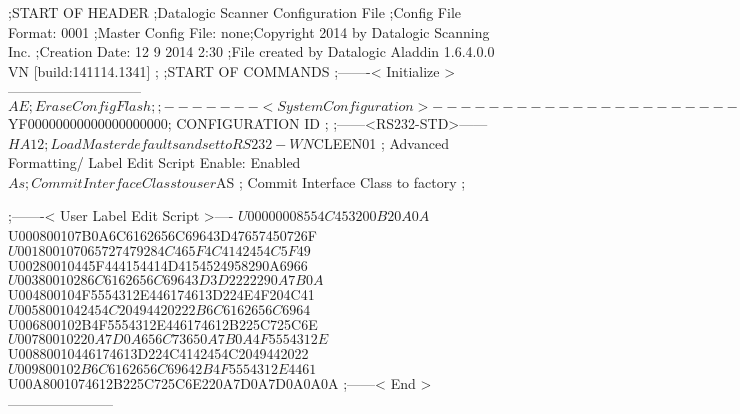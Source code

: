 ;START OF HEADER
;Datalogic Scanner Configuration File
;Config File Format: 0001
;Master Config File: none;Copyright 2014 by Datalogic Scanning Inc.
;Creation Date: 12 9 2014 2:30
;File created by Datalogic Aladdin 1.6.4.0.0 VN [build:141114.1341]
;
;START OF COMMANDS
;-------< Initialize >-----------------------------
$AE                 ; Erase Config Flash
;
;-------< System Configuration >-------------------------------
$YF00000000000000000000; CONFIGURATION ID
;
;------<RS232-STD>------
$HA12               ; Load Master defaults and set to RS232-WN
$CLEEN01            ; Advanced Formatting/ Label Edit Script Enable: Enabled
$As                 ; Commit Interface Class to user
$AS                 ; Commit Interface Class to factory
;

;-------< User Label Edit Script >----
$U00000008554C453200B20A0A
$U000800107B0A6C6162656C69643D47657450726F
$U001800107065727479284C465F4C4142454C5F49
$U00280010445F444154414D4154524958290A6966
$U00380010286C6162656C69643D3D2222290A7B0A
$U004800104F5554312E446174613D224E4F204C41
$U0058001042454C20494420222B6C6162656C6964
$U006800102B4F5554312E446174612B225C725C6E
$U00780010220A7D0A656C73650A7B0A4F5554312E
$U00880010446174613D224C4142454C2049442022
$U009800102B6C6162656C69642B4F5554312E4461
$U00A8001074612B225C725C6E220A7D0A7D0A0A0A
;------< End >-----------------------
